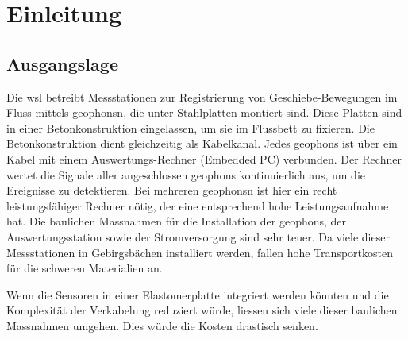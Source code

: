 %
%



\chapter{Einleitung}\label{chap.einleitung}

\section{Ausgangslage}\label{sec.ausgangslage}
Die \gls{wsl} betreibt Messstationen zur Registrierung von Geschiebe-Bewegungen im Fluss mittels \glspl{geophon}n, die unter Stahlplatten montiert sind. Diese Platten sind in einer Betonkonstruktion eingelassen, um sie im Flussbett zu fixieren. Die Betonkonstruktion dient gleichzeitig als Kabelkanal. Jedes \glspl{geophon} ist über ein Kabel mit einem Auswertungs-Rechner (Embedded PC) verbunden. Der Rechner wertet die Signale aller angeschlossen \glspl{geophon} kontinuierlich aus, um die Ereignisse zu detektieren. Bei mehreren \glspl{geophon}n ist hier ein recht leistungsfähiger Rechner nötig, der eine entsprechend hohe Leistungsaufnahme hat. Die baulichen Massnahmen für die Installation der \glspl{geophon}, der Auswertungsstation sowie der Stromversorgung sind sehr teuer. Da viele dieser Messstationen in Gebirgsbächen installiert werden, fallen hohe Transportkosten für die schweren Materialien an.

Wenn die Sensoren in einer Elastomerplatte integriert werden könnten und die Komplexität der Verkabelung reduziert würde, liessen sich viele dieser baulichen Massnahmen umgehen. Dies würde die Kosten drastisch senken.


